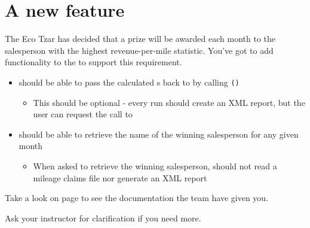 \section*{A new feature}

The Eco Tzar has decided that a prize will be awarded each month to the salesperson with the highest revenue-per-mile statistic. You've got to add functionality to the \texttt{\ShoutyReportJob} to support this requirement.


\begin{sloppypar}
\begin{itemize}
    \item \texttt{\ShoutyReportJob} should be able to pass the calculated \texttt{\EcoStat}s back to \texttt{\ShoutyStatsService} by calling \texttt{\SetEcoStatsMethod()}
    
    \begin{itemize}
        \item This should be optional - every run should create an XML report, but the user can request the call to \texttt{\SetEcoStatsMethod}
    \end{itemize}


    \item \texttt{\ShoutyReportJob} should be able to retrieve the name of the winning salesperson for any given month
    
    \begin{itemize}
        \item When asked to retrieve the winning salesperson, \texttt{\ShoutyReportJob} should not read a mileage claims file nor generate an XML report
    \end{itemize}\end{itemize}

Take a look on page \pageref{service-spec} to see the documentation the \texttt{\ShoutyStatsService} team have given you. 
\end{sloppypar}


Ask your instructor for clarification if you need more.

